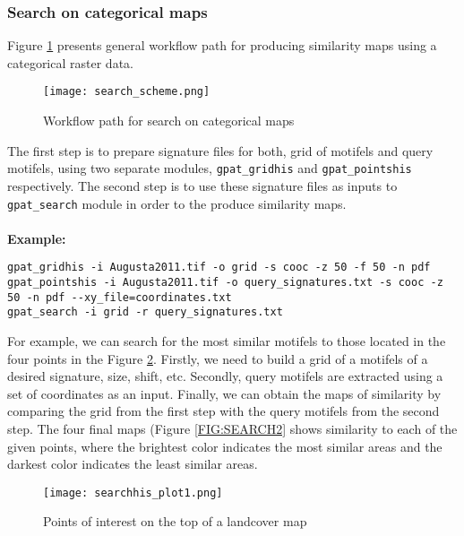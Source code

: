 \subsubsection{Search on categorical maps}
Figure \ref{FIG:SEARCH} presents general workflow path for producing similarity maps using a categorical raster data. 

\begin{figure}[H]
	\centering
	\texttt{[image: search\_scheme.png]}
	\caption{Workflow path for search on categorical maps}
	\label{FIG:SEARCH}
\end{figure}

The first step is to prepare signature files for both, grid of motifels and query motifels, using two separate modules, {\tt gpat\_gridhis} and {\tt gpat\_pointshis} respectively. 
The second step is to use these signature files as inputs to {\tt gpat\_search} module in order to the produce similarity maps.\\\\

{\bf Example:}

\begin{minipage}{\linewidth}
\begin{lstlisting}
gpat_gridhis -i Augusta2011.tif -o grid -s cooc -z 50 -f 50 -n pdf
gpat_pointshis -i Augusta2011.tif -o query_signatures.txt -s cooc -z 50 -n pdf --xy_file=coordinates.txt
gpat_search -i grid -r query_signatures.txt
\end{lstlisting}
\end{minipage}

For example, we can search for the most similar motifels to those located in the four points in the Figure \ref{FIG:SEARCH1}. 
Firstly, we need to build a grid of a motifels of a desired signature, size, shift, etc. 
Secondly, query motifels are extracted using a set of coordinates as an input. 
Finally, we can obtain the maps of similarity by comparing the grid from the first step with the query motifels from the second step.
The four final maps (Figure \ref{FIG:SEARCH2} shows similarity to each of the given points, where the brightest color indicates the most similar areas and the darkest color indicates the least similar areas.

\begin{figure}[H]
	\centering
	\texttt{[image: searchhis\_plot1.png]}
	\caption{Points of interest on the top of a landcover map}
	\label{FIG:SEARCH1}
\end{figure}

